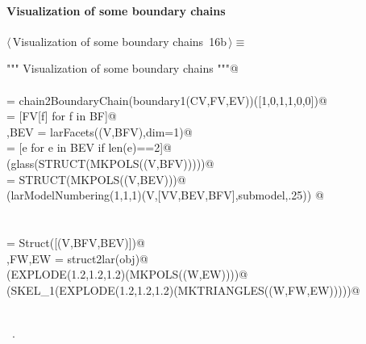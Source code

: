 \documentclass[11pt,oneside]{article}	%
\begin{document}
\paragraph{Visualization of some boundary chains}
\begin{flushleft} \small \label{scrap26}
\protect{}$\langle\,$Visualization of some boundary chains\nobreak\ {\footnotesize 16b}$\,\rangle\equiv$
\vspace{-1ex}
\begin{list}{}{} \item
\mbox{}\verb@""" Visualization of some boundary chains """@\\
\mbox{}\verb@@\\
\mbox{}\verb@BF = chain2BoundaryChain(boundary1(CV,FV,EV))([1,0,1,1,0,0])@\\
\mbox{}\verb@BFV = [FV[f] for f in BF]@\\
\mbox{}\verb@V,BEV = larFacets((V,BFV),dim=1)@\\
\mbox{}\verb@BEV = [e for e in BEV if len(e)==2]@\\
\mbox{}\verb@VIEW(glass(STRUCT(MKPOLS((V,BFV)))))@\\
\mbox{}\verb@submodel = STRUCT(MKPOLS((V,BEV)))@\\
\mbox{}\verb@VIEW(larModelNumbering(1,1,1)(V,[VV,BEV,BFV],submodel,.25)) @\\
\mbox{}\verb@@\\
\mbox{}\verb@@\\
\mbox{}\verb@obj = Struct([(V,BFV,BEV)])@\\
\mbox{}\verb@W,FW,EW = struct2lar(obj)@\\
\mbox{}\verb@VIEW(EXPLODE(1.2,1.2,1.2)(MKPOLS((W,EW))))@\\
\mbox{}\verb@VIEW(SKEL_1(EXPLODE(1.2,1.2,1.2)(MKTRIANGLES((W,FW,EW)))))@\\
\mbox{}\verb@@\\
\mbox{}\verb@@{\NWsep}
\end{list}
\vspace{-1ex}
\footnotesize\addtolength{\baselineskip}{-1ex}
\begin{list}{}{\setlength{\itemsep}{-\parsep}\setlength{\itemindent}{-\leftmargin}}
\item \NWtxtMacroRefIn\ .
\end{list}
\end{flushleft}
\end{document}
